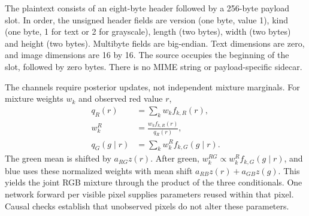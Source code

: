 \documentclass[a4paper,twoside]{article}
\begin{document}
\begin{table}[t]
\caption{Overhead means for every prospective method/direction cell. The packet's 36 framing bytes and slot padding are separate. A1 packet-positive and zero-bit positions partition its packet span. Its termination position overlaps the last positive position and is not added again. Emitted zero suffix and lookahead-zero diagnostics also overlap conceptually and are not extra payload. Text A1 has no complete-packet transport rate. The fixed full PNG has 2,976 channels. Serialized expansion divides delivered file bytes by canonical source bytes.}
\label{tab:overhead}\centering\small

\end{table}

The plaintext consists of an eight-byte header followed by a 256-byte payload slot. In order, the unsigned header fields are version (one byte, value 1), kind (one byte, 1 for text or 2 for grayscale), length (two bytes), width (two bytes) and height (two bytes). Multibyte fields are big-endian. Text dimensions are zero, and image dimensions are 16 by 16. The source occupies the beginning of the slot, followed by zero bytes. There is no MIME string or payload-specific sidecar.

The channels require posterior updates, not independent mixture marginals. For mixture weights $w_k$ and observed red value $r$,
\begin{align}
q_R(r)&=\sum_k w_k f_{k,R}(r),\\
w_k^{R}&=\frac{w_k f_{k,R}(r)}{q_R(r)},\\
q_G(g\mid r)&=\sum_k w_k^{R} f_{k,G}(g\mid r).
\end{align}
The green mean is shifted by $a_{RG}z(r)$. After green, $w_k^{RG}\propto w_k^{R}f_{k,G}(g\mid r)$, and blue uses these normalized weights with mean shift $a_{RB}z(r)+a_{GB}z(g)$. This yields the joint RGB mixture through the product of the three conditionals. One network forward per visible pixel supplies parameters reused within that pixel. Causal checks establish that unobserved pixels do not alter these parameters.
\end{document}
